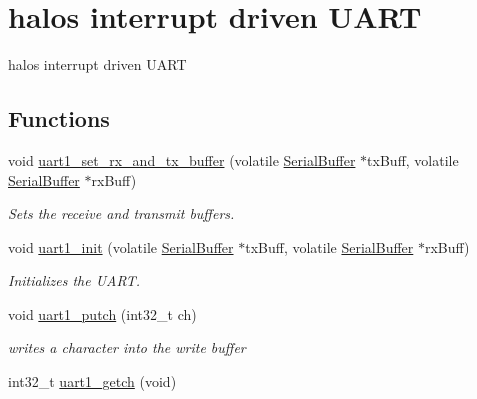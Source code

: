 \hypertarget{group___u_a_r_t}{
\section{halos interrupt driven UART}
\label{group___u_a_r_t}
}
halos interrupt driven UART  


\subsection*{Functions}
\begin{CompactItemize}
\item 
void \hyperlink{group___u_a_r_t_gd48c3413dab488fe3579ebcbee2466c7}{uart1\_\-set\_\-rx\_\-and\_\-tx\_\-buffer} (volatile \hyperlink{struct_serial_buffer_tag}{SerialBuffer} $\ast$txBuff, volatile \hyperlink{struct_serial_buffer_tag}{SerialBuffer} $\ast$rxBuff)
\begin{CompactList}\small\item\em Sets the receive and transmit buffers. \item\end{CompactList}\item 
void \hyperlink{group___u_a_r_t_gcc3cd7a0b6eb68cf02b2210cb8323459}{uart1\_\-init} (volatile \hyperlink{struct_serial_buffer_tag}{SerialBuffer} $\ast$txBuff, volatile \hyperlink{struct_serial_buffer_tag}{SerialBuffer} $\ast$rxBuff)
\begin{CompactList}\small\item\em Initializes the UART. \item\end{CompactList}\item 
void \hyperlink{group___u_a_r_t_g75dde68cc8f67ab4bfdf2ee60296265c}{uart1\_\-putch} (int32\_\-t ch)
\begin{CompactList}\small\item\em writes a character into the write buffer \item\end{CompactList}\item 
\hypertarget{group___u_a_r_t_gc8cf863b2fa1760aa3a7d78f45805c53}{
int32\_\-t \hyperlink{group___u_a_r_t_gc8cf863b2fa1760aa3a7d78f45805c53}{uart1\_\-getch} (void)}
\label{group___u_a_r_t_gc8cf863b2fa1760aa3a7d78f45805c53}


\end{CompactItemize}
